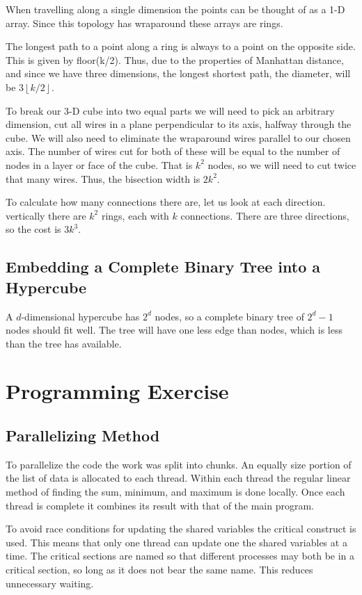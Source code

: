 \documentclass[11pt]{article}
\begin{document}
When travelling along a single dimension the points can be thought of as a 1-D array. Since this topology has wraparound these arrays are rings.

The longest path to a point along a ring is always to a point on the opposite side. This is given by floor(k/2). Thus, due to the properties of Manhattan distance, and since we have three dimensions, the longest shortest path, the diameter, will be $3\left \lfloor{k/2}\right \rfloor$.

To break our 3-D cube into two equal parts we will need to pick an arbitrary dimension, cut all wires in a plane perpendicular to its axis, halfway through the cube. We will also need to eliminate the wraparound wires parallel to our chosen axis. The number of wires cut for both of these will be equal to the number of nodes in a layer or face of the cube. That is $k^2$ nodes, so we will need to cut twice that many wires. Thus, the bisection width is $2k^2$.

To calculate how many connections there are, let us look at each direction. vertically there are $k^2$ rings, each with $k$ connections. There are three directions, so the cost is $3k^3$.

\subsection{Embedding a Complete Binary Tree into a Hypercube}
A $d$-dimensional hypercube has $2^d$ nodes, so a complete binary tree of $2^d-1$ nodes should fit well. The tree will have one less edge than nodes, which is less than the tree has available.

\section{Programming Exercise}

\subsection{Parallelizing Method}
To parallelize the code the work was split into chunks. An equally size portion of the list of data is allocated to each thread. Within each thread the regular linear method of finding the sum, minimum, and maximum is done locally. Once each thread is complete it combines its result with that of the main program.

To avoid race conditions for updating the shared variables the critical construct is used. This means that only one thread can update one the shared variables at a time. The critical sections are named so that different processes may both be in a critical section, so long as it does not bear the same name. This reduces unnecessary waiting.
\end{document}

